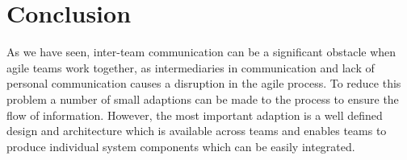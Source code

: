 \section{Conclusion}\label{sec:conclusion}
As we have seen, inter-team communication can be a significant obstacle when agile teams work together, as intermediaries in communication and lack of personal communication causes a disruption in the agile process.
To reduce this problem a number of small adaptions can be made to the process to ensure the flow of information.
However, the most important adaption is a well defined design and architecture which is available across teams and enables teams to produce individual system components which can be easily integrated.